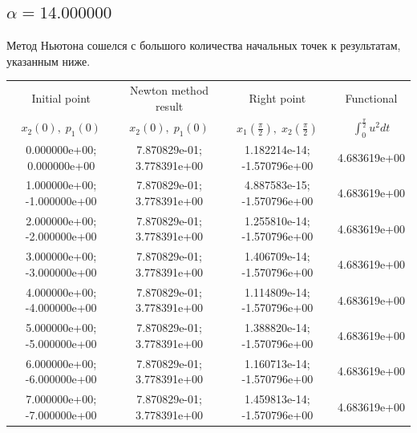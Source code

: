 \documentclass[titlepage]{article}
\def\l{\left}
\def\r{\right}
\begin{document}
\subsection{$\alpha = 14.000000$} 
Метод Ньютона сошелся с большого количества начальных точек к результатам, указанным ниже. \\ 
\begin{tabular}{ | c | c | c | c |} 
\hline 
Initial point  & Newton method result & Right point & Functional 
 \\ $x_2(0), \; p_1(0)$ & $x_2(0), \; p_1(0)$ & $x_1\l(\frac{\pi}{2}\r), \; x_2\l(\frac{\pi}{2}\r)$ & $\int_{0}^{\frac{\pi}{2}}u^2dt$  \\ \hline 
0.000000e+00; 0.000000e+00 & 7.870829e-01; 3.778391e+00 & 1.182214e-14; -1.570796e+00 & 4.683619e+00 \\ \hline 
1.000000e+00; -1.000000e+00 & 7.870829e-01; 3.778391e+00 & 4.887583e-15; -1.570796e+00 & 4.683619e+00 \\ \hline 
2.000000e+00; -2.000000e+00 & 7.870829e-01; 3.778391e+00 & 1.255810e-14; -1.570796e+00 & 4.683619e+00 \\ \hline 
3.000000e+00; -3.000000e+00 & 7.870829e-01; 3.778391e+00 & 1.406709e-14; -1.570796e+00 & 4.683619e+00 \\ \hline 
4.000000e+00; -4.000000e+00 & 7.870829e-01; 3.778391e+00 & 1.114809e-14; -1.570796e+00 & 4.683619e+00 \\ \hline 
5.000000e+00; -5.000000e+00 & 7.870829e-01; 3.778391e+00 & 1.388820e-14; -1.570796e+00 & 4.683619e+00 \\ \hline 
6.000000e+00; -6.000000e+00 & 7.870829e-01; 3.778391e+00 & 1.160713e-14; -1.570796e+00 & 4.683619e+00 \\ \hline 
7.000000e+00; -7.000000e+00 & 7.870829e-01; 3.778391e+00 & 1.459813e-14; -1.570796e+00 & 4.683619e+00 \\ \hline 
\end{tabular} 
\end{document}
